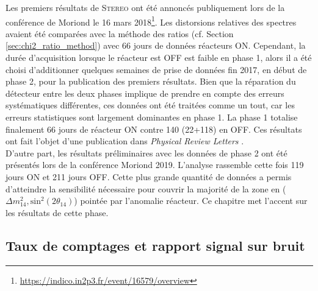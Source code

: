 Les premiers résultats de \textsc{Stereo} ont été annoncés publiquement lors de la conférence de Moriond le 16 mars 2018\footnote{\url{https://indico.in2p3.fr/event/16579/overview}}. Les distorsions relatives des spectres avaient été comparées avec la méthode des ratios (cf. Section \ref{sec:chi2_ratio_method}) avec 66 jours de données réacteurs ON. Cependant, la durée d'acquisition lorsque le réacteur est OFF est faible en phase 1, alors il a été choisi d'additionner quelques semaines de prise de données fin 2017, en début de phase 2, pour la publication des premiers résultats. Bien que la réparation du détecteur entre les deux phases implique de prendre en compte des erreurs systématiques différentes, ces données ont été traitées comme un tout, car les erreurs statistiques sont largement dominantes en phase 1. La phase 1 totalise finalement 66 jours de réacteur ON contre 140 (22+118) en OFF. Ces résultats ont fait l'objet d'une publication dans \textit{Physical Review Letters} \cite{Almazan:2018wln}.\\

D'autre part, les résultats préliminaires avec les données de phase 2 ont été présentés lors de la conférence Moriond 2019. L'analyse rassemble cette fois 119 jours ON et 211 jours OFF. Cette plus grande quantité de données a permis d'atteindre la sensibilité nécessaire pour couvrir la majorité de la zone en ($\Delta m_{14}^2, \textrm{sin}^2(2\theta_{14})$) pointée par l'anomalie réacteur. Ce chapitre met l'accent sur les résultats de cette phase.

\bigbreak

\subsection{Taux de comptages et rapport signal sur bruit}

